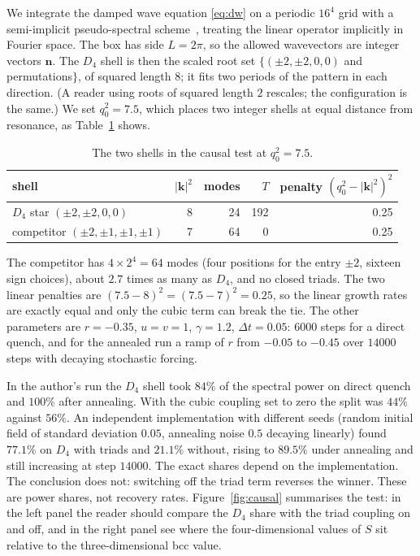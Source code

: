 \documentclass[a4paper,11pt]{article}
\let\jsOldToprule\toprule
\renewcommand{\toprule}{\jsOldToprule\rowcolor{bgheader}}
\numberwithin{equation}{section}
\theoremstyle{jsplain}
\theoremstyle{jsrem}
\begin{document}
We integrate the damped wave equation \eqref{eq:dw} on a periodic $16^4$ grid with a semi-implicit pseudo-spectral scheme~\cite{ref10}, treating the linear operator implicitly in Fourier space. The box has side $L=2\pi$, so the allowed wavevectors are integer vectors $\mathbf{n}$. The $D_4$ shell is then the scaled root set $\{(\pm2,\pm2,0,0)$ and permutations$\}$, of squared length $8$; it fits two periods of the pattern in each direction. (A reader using roots of squared length $2$ rescales; the configuration is the same.) We set $q_0^2=7.5$, which places two integer shells at equal distance from resonance, as Table~\ref{tab:compet} shows.

\begin{table}[htbp]
\centering
\begin{tabular}{lrrrr}
\toprule
shell & $|\mathbf{k}|^2$ & modes & $T$ & penalty $(q_0^2-|\mathbf{k}|^2)^2$\\
\midrule
$D_4$ star $(\pm2,\pm2,0,0)$ & 8 & 24 & 192 & 0.25\\
competitor $(\pm2,\pm1,\pm1,\pm1)$ & 7 & 64 & 0 & 0.25\\
\bottomrule
\end{tabular}
\caption{The two shells in the causal test at $q_0^2=7.5$.}
\label{tab:compet}
\end{table}

The competitor has $4\times2^4=64$ modes (four positions for the entry $\pm2$, sixteen sign choices), about $2.7$ times as many as $D_4$, and no closed triads. The two linear penalties are $(7.5-8)^2=(7.5-7)^2=0.25$, so the linear growth rates are exactly equal and only the cubic term can break the tie. The other parameters are $r=-0.35$, $u=v=1$, $\gamma=1.2$, $\Delta t=0.05$: $6000$ steps for a direct quench, and for the annealed run a ramp of $r$ from $-0.05$ to $-0.45$ over $14000$ steps with decaying stochastic forcing.

In the author's run the $D_4$ shell took $84\%$ of the spectral power on direct quench and $100\%$ after annealing. With the cubic coupling set to zero the split was $44\%$ against $56\%$. An independent implementation with different seeds (random initial field of standard deviation $0.05$, annealing noise $0.5$ decaying linearly) found $77.1\%$ on $D_4$ with triads and $21.1\%$ without, rising to $89.5\%$ under annealing and still increasing at step $14000$. The exact shares depend on the implementation. The conclusion does not: switching off the triad term reverses the winner. These are power shares, not recovery rates. Figure~\ref{fig:causal} summarises the test: in the left panel the reader should compare the $D_4$ share with the triad coupling on and off, and in the right panel see where the four-dimensional values of $S$ sit relative to the three-dimensional bcc value.
\end{document}
